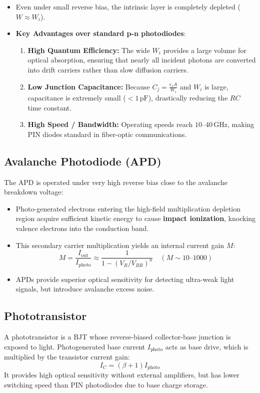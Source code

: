 \documentclass[12pt,a4paper]{article}
\begin{document}
\begin{itemize}[leftmargin=*, itemsep=3pt]
  \item Even under small reverse bias, the intrinsic layer is completely depleted ($W \approx W_i$).
  \item \textbf{Key Advantages over standard p-n photodiodes}:
    \begin{enumerate}
      \item \textbf{High Quantum Efficiency:} The wide $W_i$ provides a large volume for optical absorption, ensuring that nearly all incident photons are converted into drift carriers rather than slow diffusion carriers.
      \item \textbf{Low Junction Capacitance:} Because $C_j = \frac{\epsilon_s A}{W_i}$ and $W_i$ is large, capacitance is extremely small ($< 1\,\text{pF}$), drastically reducing the $RC$ time constant.
      \item \textbf{High Speed / Bandwidth:} Operating speeds reach $10\text{--}40\,\text{GHz}$, making PIN diodes standard in fiber-optic communications.
    \end{enumerate}
\end{itemize}

\subsection{Avalanche Photodiode (APD)}
The APD is operated under very high reverse bias close to the avalanche breakdown voltage:
\begin{itemize}[leftmargin=*, itemsep=3pt]
  \item Photo-generated electrons entering the high-field multiplication depletion region acquire sufficient kinetic energy to cause \textbf{impact ionization}, knocking valence electrons into the conduction band.
  \item This secondary carrier multiplication yields an internal current gain $M$:
  \begin{equation}
    M = \frac{I_{\text{out}}}{I_{\text{photo}}} \approx \frac{1}{1 - (V_R / V_{BR})^n} \quad (M \sim 10\text{--}1000)
  \end{equation}
  \item APDs provide superior optical sensitivity for detecting ultra-weak light signals, but introduce avalanche excess noise.
\end{itemize}

\subsection{Phototransistor}
A phototransistor is a BJT whose reverse-biased collector-base junction is exposed to light. Photogenerated base current $I_{\text{photo}}$ acts as base drive, which is multiplied by the transistor current gain:
\begin{equation}
  I_C = (\beta + 1) I_{\text{photo}}
\end{equation}
It provides high optical sensitivity without external amplifiers, but has lower switching speed than PIN photodiodes due to base charge storage.
\end{document}
